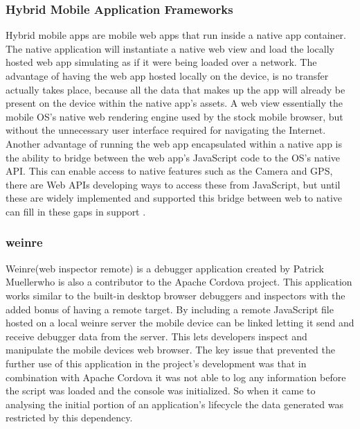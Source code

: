 \documentclass[final]{cmpreport}
\begin{document}
\subsubsection{Hybrid Mobile Application Frameworks}
Hybrid mobile apps are mobile web apps that run inside a native app container. The native application will instantiate a native web view and load the locally hosted web app simulating as if it were being loaded over a network. The advantage of having the web app hosted locally on the device, is no transfer actually takes place, because all the data that makes up the app will already be present on the device within the native app's assets. A web view essentially the mobile OS's native web rendering engine used by the stock mobile browser, but without the unnecessary user interface required for navigating the Internet. Another advantage of running the web app encapsulated within a native app is the ability to bridge between the web app's JavaScript code to the OS's native API. This can enable access to native features such as the Camera and GPS, there are Web APIs developing ways to access these from JavaScript, but until these are widely implemented and supported this bridge between web to native can fill in these gaps in support \cite{Smith}.

\subsubsection{weinre}
\label{sec:weinre}
Weinre\footnotemark (web inspector remote) is a debugger application created by Patrick Mueller\footnotemark who is also a contributor to the Apache Cordova project. This application works similar to the built-in desktop browser debuggers and inspectors with the added bonus of having a remote target. By including a remote JavaScript file hosted on a local weinre server the mobile device can be linked letting it send and receive debugger data from the server. This lets developers inspect and manipulate the mobile devices web browser. The key issue that prevented the further use of this application in the project's development was that in combination with Apache Cordova it was not able to log any information before the script was loaded and the console was initialized. So when it came to analysing the initial portion of an application's lifecycle the data generated was restricted by this dependency.

\end{document}
